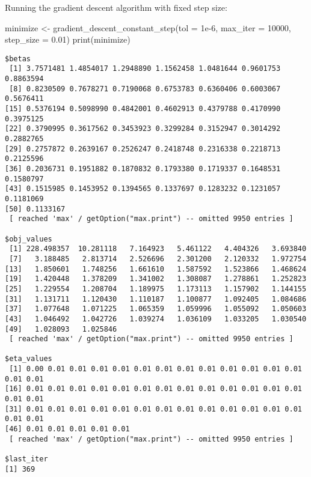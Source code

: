 \documentclass[
  letterpaper,
  DIV=11,
  numbers=noendperiod]{scrartcl}
\newenvironment{Shaded}{\begin{snugshade}}{\end{snugshade}}
\newcommand{\AttributeTok}[1]{\textcolor[rgb]{0.40,0.45,0.13}{#1}}
\newcommand{\DecValTok}[1]{\textcolor[rgb]{0.68,0.00,0.00}{#1}}
\newcommand{\FloatTok}[1]{\textcolor[rgb]{0.68,0.00,0.00}{#1}}
\newcommand{\FunctionTok}[1]{\textcolor[rgb]{0.28,0.35,0.67}{#1}}
\newcommand{\NormalTok}[1]{\textcolor[rgb]{0.00,0.23,0.31}{#1}}
\newcommand{\OtherTok}[1]{\textcolor[rgb]{0.00,0.23,0.31}{#1}}
\begin{document}
Running the gradient descent algorithm with fixed step size:

\begin{Shaded}
\begin{Highlighting}[]
\NormalTok{minimize }\OtherTok{\textless{}{-}} \FunctionTok{gradient\_descent\_constant\_step}\NormalTok{(}\AttributeTok{tol =} \FloatTok{1e{-}6}\NormalTok{, }\AttributeTok{max\_iter =} \DecValTok{10000}\NormalTok{, }\AttributeTok{step\_size =} \FloatTok{0.01}\NormalTok{)}
\FunctionTok{print}\NormalTok{(minimize)}
\end{Highlighting}
\end{Shaded}

\begin{verbatim}
$betas
 [1] 3.7571481 1.4854017 1.2948890 1.1562458 1.0481644 0.9601753 0.8863594
 [8] 0.8230509 0.7678271 0.7190068 0.6753783 0.6360406 0.6003067 0.5676411
[15] 0.5376194 0.5098990 0.4842001 0.4602913 0.4379788 0.4170990 0.3975125
[22] 0.3790995 0.3617562 0.3453923 0.3299284 0.3152947 0.3014292 0.2882765
[29] 0.2757872 0.2639167 0.2526247 0.2418748 0.2316338 0.2218713 0.2125596
[36] 0.2036731 0.1951882 0.1870832 0.1793380 0.1719337 0.1648531 0.1580797
[43] 0.1515985 0.1453952 0.1394565 0.1337697 0.1283232 0.1231057 0.1181069
[50] 0.1133167
 [ reached 'max' / getOption("max.print") -- omitted 9950 entries ]

$obj_values
 [1] 228.498357  10.281118   7.164923   5.461122   4.404326   3.693840
 [7]   3.188485   2.813714   2.526696   2.301200   2.120332   1.972754
[13]   1.850601   1.748256   1.661610   1.587592   1.523866   1.468624
[19]   1.420448   1.378209   1.341002   1.308087   1.278861   1.252823
[25]   1.229554   1.208704   1.189975   1.173113   1.157902   1.144155
[31]   1.131711   1.120430   1.110187   1.100877   1.092405   1.084686
[37]   1.077648   1.071225   1.065359   1.059996   1.055092   1.050603
[43]   1.046492   1.042726   1.039274   1.036109   1.033205   1.030540
[49]   1.028093   1.025846
 [ reached 'max' / getOption("max.print") -- omitted 9950 entries ]

$eta_values
 [1] 0.00 0.01 0.01 0.01 0.01 0.01 0.01 0.01 0.01 0.01 0.01 0.01 0.01 0.01 0.01
[16] 0.01 0.01 0.01 0.01 0.01 0.01 0.01 0.01 0.01 0.01 0.01 0.01 0.01 0.01 0.01
[31] 0.01 0.01 0.01 0.01 0.01 0.01 0.01 0.01 0.01 0.01 0.01 0.01 0.01 0.01 0.01
[46] 0.01 0.01 0.01 0.01 0.01
 [ reached 'max' / getOption("max.print") -- omitted 9950 entries ]

$last_iter
[1] 369
\end{verbatim}
\end{document}
